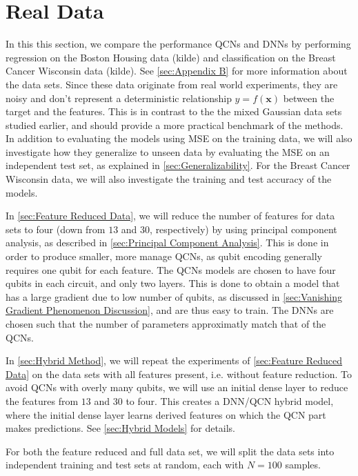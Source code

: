 \section{Real Data}\label{sec:Real Data}
In this this section, we compare the performance QCNs and DNNs by performing regression on the Boston Housing data (kilde) and classification on the Breast Cancer Wisconsin data (kilde). See \autoref{sec:Appendix B} for more information about the data sets. Since these data originate from real world experiments, they are noisy and don't represent a deterministic relationship $y = f(\boldsymbol{x})$ between the target and the features. This is in contrast to the the mixed Gaussian data sets studied earlier, and should provide a more practical benchmark of the methods. In addition to evaluating the models using MSE on the training data, we will also investigate how they generalize to unseen data by evaluating the MSE on an independent test set, as explained in \autoref{sec:Generalizability}. For the Breast Cancer Wisconsin data, we will also investigate the training and test accuracy of the models.

In \autoref{sec:Feature Reduced Data}, we will reduce the number of features for data sets to four (down from $13$ and $30$, respectively) by using principal component analysis, as described in \autoref{sec:Principal Component Analysis}. This is done in order to produce smaller, more manage QCNs, as qubit encoding generally requires one qubit for each feature. The QCNs models are chosen to have four qubits in each circuit, and only two layers. This is done to obtain a model that has a large gradient due to low number of qubits, as discussed in \autoref{sec:Vanishing Gradient Phenomenon Discussion}, and are thus easy to train. The DNNs are chosen such that the number of parameters approximatly match that of the QCNs. 

In \autoref{sec:Hybrid Method}, we will repeat the experiments of \autoref{sec:Feature Reduced Data} on the data sets with all features present, i.e. without feature reduction. To avoid QCNs with overly many qubits, we will use an initial dense layer to reduce the features from $13$ and $30$ to four. This creates a DNN/QCN hybrid model, where the initial dense layer learns derived features on which the QCN part makes predictions. See \autoref{sec:Hybrid Models} for details. 

For both the feature reduced and full data set, we will split the data sets into independent training and test sets at random, each with $N=100$ samples. 

